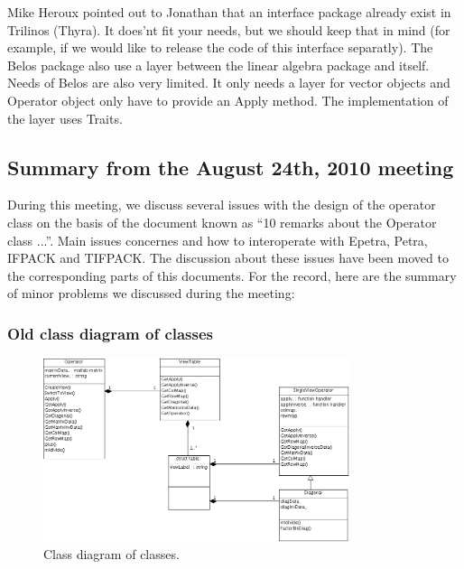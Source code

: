 
Mike Heroux pointed out to Jonathan that an interface package already exist in Trilinos (Thyra). It does'nt fit your needs, but we should keep that in mind (for example, if we would like to release the code of this interface separatly).
The Belos package also use a layer between the linear algebra package and itself. Needs of Belos are also very limited. It only needs a layer for vector objects and Operator object only have to provide an Apply method. The implementation of the layer uses Traits.


\MeetingSummary
\subsection{Summary from the August 24th, 2010 meeting}

During this meeting, we discuss several issues with the design of the operator class on the basis of the document known as ``10 remarks about the Operator class ...''.
Main issues concernes \mulu and how to interoperate with Epetra, Petra, IFPACK and TIFPACK. The discussion about these issues have been moved to the corresponding parts of this documents.
For the record, here are the summary of minor problems we discussed during the meeting:

\subsubsection{Old class diagram of \Operator classes}

\begin{figure}
\centering  \includegraphics[angle=90,width=0.8\textwidth]{figs/bkp/MueMatOperatorClassDiagram.png}
  \caption{Class diagram of \Operator classes.}
  \label{fig:old:OperatorClassDiagram}
\end{figure}

